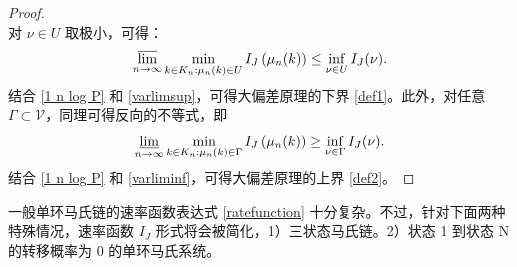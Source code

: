 \begin{proof}
\begin{equation*}
\end{equation*}
对 $\nu\in U$ 取极小，可得：
\begin{equation}\label{varlimsup}
\varlimsup_{n\to\infty}\min_{k\in K_n: \mu_n(k) \in U}I_J\left(\mu_{n}(k)\right)\le \inf_{\nu\in U}I_J(\nu).
\end{equation}
结合 \eqref{1 n log P} 和 \eqref{varlimsup}，可得大偏差原理的下界 \eqref{def1}。此外，对任意$\Gamma \subset \mathcal{V}$，同理可得反向的不等式，即
\begin{equation}\label{varliminf}
\varliminf_{n\to\infty}\min_{k\in K_n: \mu_n(k) \in \Gamma}I_J\left(\mu_{n}(k)\right)\ge \inf_{\nu\in \Gamma}I_J(\nu).
\end{equation}
结合 \eqref{1 n log P} 和 \eqref{varliminf}，可得大偏差原理的上界 \eqref{def2}。
\end{proof}

一般单环马氏链的速率函数表达式 \eqref{ratefunction} 十分复杂。不过，针对下面两种特殊情况，速率函数 $I_J$ 形式将会被简化，1）三状态马氏链。2）状态 1 到状态 N 的转移概率为 0 的单环马氏系统。

